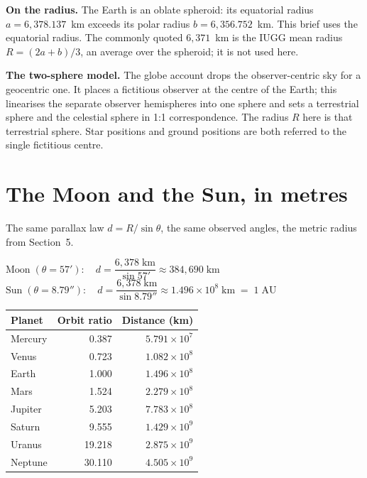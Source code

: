 \documentclass[11pt]{article}
\begin{document}
\begin{tcolorbox}[quotebox]
\textbf{On the radius.} The Earth is an oblate spheroid: its equatorial
radius $a = 6{,}378.137$~km exceeds its polar radius $b = 6{,}356.752$~km.
This brief uses the equatorial radius. The commonly quoted $6{,}371$~km is
the IUGG mean radius $R = (2a+b)/3$, an average over the spheroid; it is not
used here.
\end{tcolorbox}

\begin{tcolorbox}[quotebox]
\textbf{The two-sphere model.} The globe account drops the observer-centric
sky for a geocentric one. It places a fictitious observer at the centre of
the Earth; this linearises the separate observer hemispheres into one sphere
and sets a terrestrial sphere and the celestial sphere in 1:1 correspondence.
The radius $R$ here is that terrestrial sphere. Star positions and ground
positions are both referred to the single fictitious centre.
\end{tcolorbox}

\section{The Moon and the Sun, in metres}

The same parallax law $d = R/\sin\theta$, the same observed angles, the
metric radius from Section~5.

\begin{tcolorbox}[mathbox]
$\text{Moon}\;(\theta = 57'):\quad
 d = \dfrac{6{,}378\;\text{km}}{\sin 57'} \approx 384{,}690\;\text{km}$
\\[14pt]
$\text{Sun}\;(\theta = 8.79''):\quad
 d = \dfrac{6{,}378\;\text{km}}{\sin 8.79''}
 \approx 1.496\times10^{8}\;\text{km} \;=\; 1\;\text{AU}$
\end{tcolorbox}

\begin{center}
\renewcommand{\arraystretch}{1.15}
\begin{tabular}{l r r}
\textbf{Planet} & \textbf{Orbit ratio} & \textbf{Distance (km)}\\
\hline
Mercury &  0.387 & $5.791\times10^{7}$\\
Venus   &  0.723 & $1.082\times10^{8}$\\
Earth   &  1.000 & $1.496\times10^{8}$\\
Mars    &  1.524 & $2.279\times10^{8}$\\
Jupiter &  5.203 & $7.783\times10^{8}$\\
Saturn  &  9.555 & $1.429\times10^{9}$\\
Uranus  & 19.218 & $2.875\times10^{9}$\\
Neptune & 30.110 & $4.505\times10^{9}$\\
\hline
\end{tabular}
\end{center}
\end{document}
